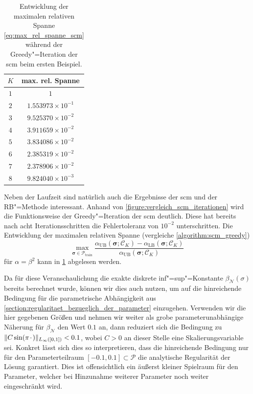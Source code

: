 \documentclass[../main.tex]{subfiles}
\begin{document}
\begin{table}[tb]
    \centering
    \begin{tabular}{|c|c|}\hline
     $K$ &      max. rel. Spanne \\ \hline
     $1$ &          $1$              \\ %
     $2$ & $1.553973{\times}10^{-1}$ \\ %
     $3$ & $9.525370{\times}10^{-2}$ \\ %
     $4$ & $3.911659{\times}10^{-2}$ \\ %
     $5$ & $3.834086{\times}10^{-2}$ \\ %
     $6$ & $2.385319{\times}10^{-2}$ \\ %
     $7$ & $2.378906{\times}10^{-2}$ \\ %
     $8$ & $9.824040{\times}10^{-3}$ \\ \hline
    \end{tabular}
    \caption[Entwicklung der maximalen relativen Spanne bei der \ac{scm}, erstes Beispiel.]{%
        Entwicklung der maximalen relativen Spanne \cref{eq:max_rel_spanne_scm} während der Greedy"=Iteration der \ac{scm} beim ersten Beispiel.
    }
    \label{table:entwicklung_scm_abweichung}
\end{table}

Neben der Laufzeit sind natürlich auch die Ergebnisse der \ac{scm} und der RB"=Methode interessant.
Anhand von \cref{figure:vergleich_scm_iterationen} wird die Funktionsweise der Greedy"=Iteration der \ac{scm} deutlich.
Diese hat bereits nach acht Iterationsschritten die Fehlertoleranz von $10^{-2}$ unterschritten.
Die Entwicklung der maximalen relativen Spanne (vergleiche \cref{algorithm:scm_greedy})
\begin{equation}\label{eq:max_rel_spanne_scm}
    \max_{\bm \sigma \in \mathcal P_{\mathrm{train}}}
    \frac{\alpha_{\mathrm{UB}}(\bm \sigma; \mathcal C_{K}) - \alpha_{\mathrm{LB}}(\bm \sigma; \mathcal C_{K})}{\alpha_{\mathrm{UB}}(\bm \sigma; \mathcal C_{K})}
\end{equation}
für $\alpha = \beta^{2}$ kann in \cref{table:entwicklung_scm_abweichung} abgelesen werden.

Da für diese Veranschaulichung die exakte diskrete inf"=sup"=Konstante $\beta_{\mathcal N}(\sigma)$ bereits berechnet wurde, können wir dies auch nutzen, um auf die hinreichende Bedingung für die parametrische Abhängigkeit aus \cref{section:regularitaet_bezueglich_der_parameter} einzugehen.
Verwenden wir die hier gegebenen Größen und nehmen wir weiter als grobe parameterunabhängige Näherung für $\beta_{\mathcal N}$ den Wert $0.1$ an, dann reduziert sich die Bedingung zu $\lVert C \sin(\pi {\mkern2mu\cdot\mkern2mu})\rVert_{L_{\infty}([0, 1])} < 0.1$, wobei $C > 0$ an dieser Stelle eine Skalierungsvariable sei.
Konkret lässt sich dies so interpretieren, dass die hinreichende Bedingung nur für den Parameterteilraum $[-0.1, 0.1] \subset \mathcal P$ die analytische Regularität der Lösung garantiert.
Dies ist offensichtlich ein äußerst kleiner Spielraum für den Parameter, welcher bei Hinzunahme weiterer Parameter noch weiter eingeschränkt wird.
\end{document}
